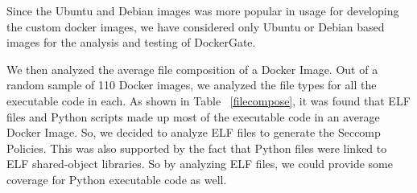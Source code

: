 Since the Ubuntu and Debian images was more popular in usage for developing the custom docker images, we have considered only Ubuntu or Debian based images for the analysis and testing of DockerGate.

\begin{table}
\centering
{}
\caption{Top 10 base images used in building a Docker Image}
\label{topbaseimages}
\end{table}
We then analyzed the average file composition of a Docker Image. Out of a random sample of 110 Docker images, we analyzed the file types for all the executable code in each. As shown in Table ~\ref{filecompose}, it was found that ELF files and Python scripts made up most of the executable code in an average Docker Image. So, we decided to analyze ELF files to generate the Seccomp Policies. This was also supported by the fact that Python files were linked to ELF shared-object libraries. So by analyzing ELF files, we could provide some coverage for Python executable code as well.

\begin{table}
\centering
{}
\caption{Container status after loading them with DockerGate generated Seccomp policy}
\label{tab:seccompresults}
\end{table}

